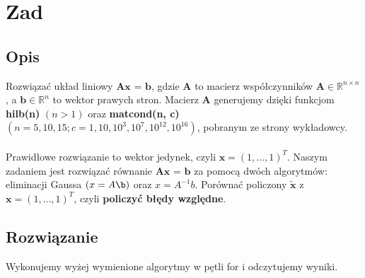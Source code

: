 \documentclass[10pt,a4paper, polish]{article}
\begin{document}
\section{Zad}
\subsection*{Opis}
Rozwiązać układ liniowy $ \textbf{Ax = b} $, gdzie $\textbf{A}$ to macierz współczynników $ \textbf{A} \in \mathbb{R}^{n \times n} $, a $ \textbf{b} \in \mathbb{R}^{n} $ to wektor prawych stron. Macierz $ \textbf{A} $ generujemy dzięki funkcjom \textbf{hilb(n)} $(n > 1)$ oraz \textbf{matcond(n, c)} $(n = 5, 10, 15; c = 1, 10, 10^3, 10^7, 10^{12}, 10^{16})$,  pobranym ze strony wykładowcy.\\\\
Prawidłowe rozwiązanie to wektor jedynek, czyli $ \textbf{x} = (1,..., 1)^\textit{T}$. Naszym zadaniem jest rozwiązać równanie  $ \textbf{Ax = b} $ za pomocą dwóch algorytmów: eliminacji Gaussa $(x=A\b) $ oraz $x = A^{-1}b$. Porównać policzony $\tilde{\textbf{x}}$ z $ \textbf{x} = (1,..., 1)^\textit{T}$, czyli \textbf{policzyć błędy względne}.
\subsection*{Rozwiązanie}
Wykonujemy wyżej wymienione algorytmy w pętli for i odczytujemy wyniki.
\end{document}
